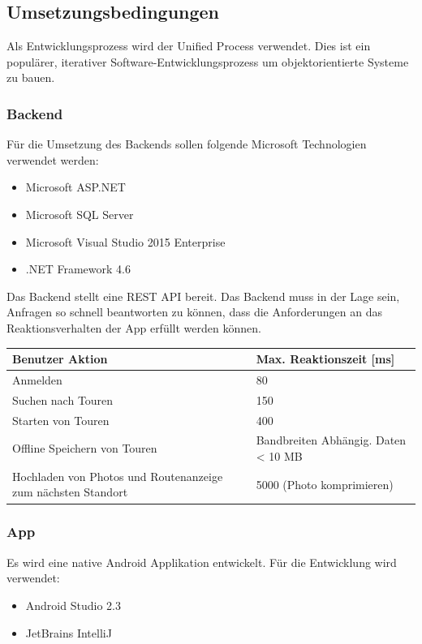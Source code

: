 \documentclass[a4paper,10pt,xetex]{article}
\begin{document}
\subsection{Umsetzungsbedingungen}\label{umsetzungsbedingungen}
Als Entwicklungsprozess wird der Unified Process verwendet. Dies ist ein
populärer, iterativer Software-Entwicklungsprozess um objektorientierte
Systeme zu bauen.\cite{UP}


\subsubsection{Backend}\label{backend}
Für die Umsetzung des Backends sollen folgende Microsoft Technologien
verwendet werden:

\begin{itemize}
  \item Microsoft ASP.NET
  \item Microsoft SQL Server
  \item Microsoft Visual Studio 2015 Enterprise
  \item .NET Framework 4.6
\end{itemize}

Das Backend stellt eine REST API bereit. Das Backend muss in der Lage
sein, Anfragen so schnell beantworten zu können, dass die Anforderungen
an das Reaktionsverhalten der App erfüllt werden können.

\begin{longtabu} to \textwidth { | X[l] | l | }
\hline
\textbf{Benutzer Aktion} & \textbf{Max. Reaktionszeit {[}ms{]}}\\\hline
\endhead

Anmelden & 80\\\hline
Suchen nach Touren & 150\\\hline
Starten von Touren & 400\\\hline
Offline Speichern von Touren & Bandbreiten Abhängig. Daten \textless{} 10 MB\\\hline
Hochladen von Photos und Routenanzeige zum nächsten Standort & 5000 (Photo komprimieren)\\\hline
\end{longtabu}


\subsubsection{App}\label{app}
Es wird eine native Android Applikation entwickelt. Für die Entwicklung
wird verwendet:

\begin{itemize}
  \item Android Studio 2.3
  \item JetBrains IntelliJ
\end{itemize}
\end{document}
